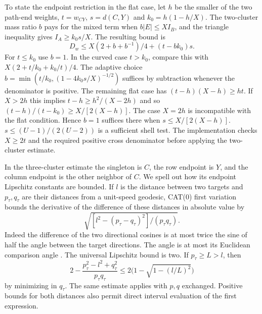 \documentclass[11pt,a4paper]{article}
\theoremstyle{definition}
\begin{document}
To state the endpoint restriction in the flat case, let $h$ be the
smaller of the two path-end weights, $t=w_{CY}$, $s=d(C,Y)$ and
$k_0=h(1-h/X)$. The two-cluster mass ratio $b$ pays for the mixed term
when $b|E|\le XI_B$, and the triangle inequality gives
$I_A\ge k_0 s/X$. The resulting bound is
\[
 D_w\le X(2+b+b^{-1})/4+(t-bk_0)s .
\]
For $t\le k_0$ use $b=1$. In the curved case $t>k_0$, compare this with
$X(2+t/k_0+k_0/t)/4$. The adaptive choice
$b=\min(t/k_0,(1-4k_0s/X)^{-1/2})$ suffices by subtraction whenever
the denominator is positive. The remaining flat case has
$(t-h)(X-h)\ge ht$. If $X>2h$ this implies
$t-h\ge h^2/(X-2h)$ and so
$(t-h)/(t-k_0)\ge X/[2(X-h)]$. The case $X=2h$ is incompatible with
the flat condition. Hence $b=1$ suffices there when
$s\le X/[2(X-h)]$. $s\le(U-1)/(2(U-2))$ is a sufficient shell test.
The implementation checks $X\ge2t$ and the required positive cross
denominator before applying the two-cluster estimate.

In the three-cluster estimate the singleton is $C$, the row endpoint is
$Y$, and the column endpoint is the other neighbor of $C$. We spell out how
its endpoint Lipschitz constants are bounded. If $l$ is the distance
between two targets and $p_\tau,q_\tau$ are their distances from a
unit-speed geodesic, CAT(0) first variation bounds the derivative of the
difference of these distances in absolute value by
\[
 \sqrt{[l^2-(p_\tau-q_\tau)^2]/(p_\tau q_\tau)}.
\]
Indeed the difference of the two directional cosines is at most twice
the sine of half the angle between the target directions. The angle is
at most its Euclidean comparison angle \cite{CAT,BH}. The universal
Lipschitz bound is two. If $p_\tau\ge L>l$, then
\[
 2-\frac{p_\tau^2-l^2+q_\tau^2}{p_\tau q_\tau}
 \le 2\big(1-\sqrt{1-(l/L)^2}\big)
\]
by minimizing in $q_\tau$. The same estimate applies with $p,q$
exchanged. Positive bounds for both distances also permit direct interval
evaluation of the first expression.
\end{document}
